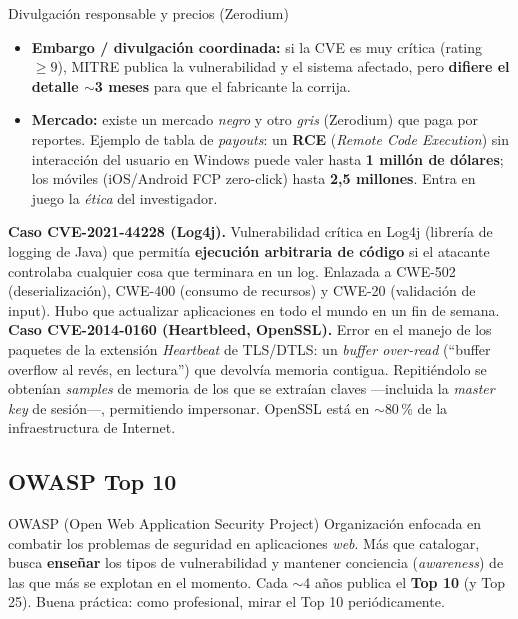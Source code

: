 \documentclass[11pt,a4paper]{article}
\begin{document}
\begin{practbox}{Divulgación responsable y precios (Zerodium)}
\begin{itemize}[leftmargin=1.3em,itemsep=2pt]
  \item \textbf{Embargo / divulgación coordinada:} si la CVE es muy crítica (rating $\ge 9$),
        MITRE publica la vulnerabilidad y el sistema afectado, pero \textbf{difiere el detalle
        $\sim$3 meses} para que el fabricante la corrija.
  \item \textbf{Mercado:} existe un mercado \emph{negro} y otro \emph{gris} (Zerodium) que paga
        por reportes. Ejemplo de tabla de \emph{payouts}: un \textbf{RCE} (\emph{Remote Code
        Execution}) sin interacción del usuario en Windows puede valer hasta \textbf{1 millón de
        dólares}; los móviles (iOS/Android FCP zero-click) hasta \textbf{2,5 millones}. Entra en
        juego la \emph{ética} del investigador.
\end{itemize}
\end{practbox}

\begin{slidebox}
\textbf{Caso CVE-2021-44228 (Log4j).} Vulnerabilidad crítica en Log4j (librería de logging de
Java) que permitía \textbf{ejecución arbitraria de código} si el atacante controlaba cualquier
cosa que terminara en un log. Enlazada a CWE-502 (deserialización), CWE-400 (consumo de recursos)
y CWE-20 (validación de input). Hubo que actualizar aplicaciones en todo el mundo en un fin de
semana.\\[4pt]
\textbf{Caso CVE-2014-0160 (Heartbleed, OpenSSL).} Error en el manejo de los paquetes de la
extensión \emph{Heartbeat} de TLS/DTLS: un \emph{buffer over-read} (``buffer overflow al revés,
en lectura'') que devolvía memoria contigua. Repitiéndolo se obtenían \emph{samples} de memoria
de los que se extraían claves —incluida la \emph{master key} de sesión—, permitiendo impersonar.
OpenSSL está en $\sim$80\,\% de la infraestructura de Internet.
\end{slidebox}

\subsection{OWASP Top 10}

\begin{defbox}{OWASP (Open Web Application Security Project)}
Organización enfocada en combatir los problemas de seguridad en aplicaciones \emph{web}. Más que
catalogar, busca \textbf{enseñar} los tipos de vulnerabilidad y mantener conciencia
(\emph{awareness}) de las que más se explotan en el momento. Cada $\sim$4 años publica el
\textbf{Top 10} (y Top 25). Buena práctica: como profesional, mirar el Top 10 periódicamente.
\end{defbox}
\end{document}
